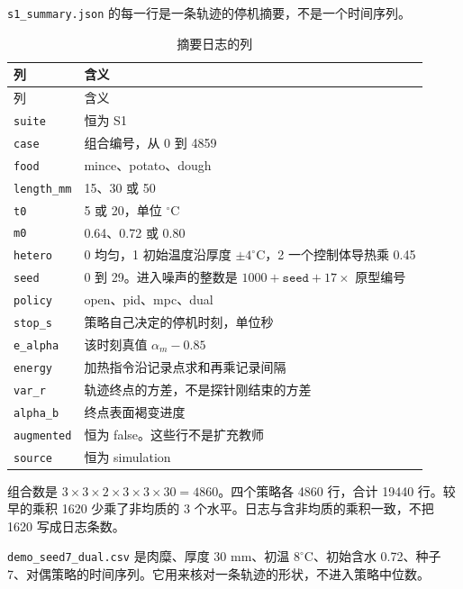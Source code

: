 \texttt{s1\_summary.json} 的每一行是一条轨迹的停机摘要，不是一个时间序列。

\begin{longtable}{lp{10cm}}
\caption{摘要日志的列}\\
\toprule
列 & 含义 \\
\midrule
\endfirsthead
\toprule
列 & 含义 \\
\midrule
\endhead
\texttt{suite} & 恒为 S1 \\
\texttt{case} & 组合编号，从 0 到 4859 \\
\texttt{food} & mince、potato、dough \\
\texttt{length\_mm} & 15、30 或 50 \\
\texttt{t0} & 5 或 20，单位 \(^\circ\mathrm{C}\) \\
\texttt{m0} & 0.64、0.72 或 0.80 \\
\texttt{hetero} & 0 均匀，1 初始温度沿厚度 \(\pm 4^\circ\mathrm{C}\)，2 一个控制体导热乘 0.45 \\
\texttt{seed} & 0 到 29。进入噪声的整数是 \(1000+\texttt{seed}+17\times\) 原型编号 \\
\texttt{policy} & open、pid、mpc、dual \\
\texttt{stop\_s} & 策略自己决定的停机时刻，单位秒 \\
\texttt{e\_alpha} & 该时刻真值 \(\alpha_m-0.85\) \\
\texttt{energy} & 加热指令沿记录点求和再乘记录间隔 \\
\texttt{var\_r} & 轨迹终点的方差，不是探针刚结束的方差 \\
\texttt{alpha\_b} & 终点表面褐变进度 \\
\texttt{augmented} & 恒为 false。这些行不是扩充教师 \\
\texttt{source} & 恒为 simulation \\
\bottomrule
\end{longtable}

组合数是 \(3\times 3\times 2\times 3\times 3\times 30=4860\)。四个策略各 4860 行，合计 19440 行。较早的乘积 1620 少乘了非均质的 3 个水平。日志与含非均质的乘积一致，不把 1620 写成日志条数。

\texttt{demo\_seed7\_dual.csv} 是肉糜、厚度 30 mm、初温 \(8^\circ\mathrm{C}\)、初始含水 0.72、种子 7、对偶策略的时间序列。它用来核对一条轨迹的形状，不进入策略中位数。

